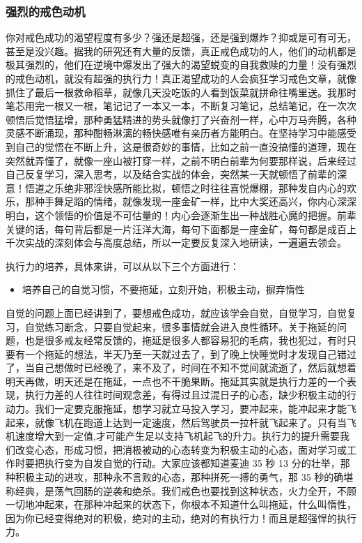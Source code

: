 \subsubsection{强烈的戒色动机}

你对戒色成功的渴望程度有多少？强还是超强，还是强到爆炸？抑或是可有可无，甚至是没兴趣。据我的研究还有大量的反馈，真正戒色成功的人，他们的动机都是极其强烈的，他们在逆境中爆发出了强大的渴望蜕变的自我救赎的力量！没有强烈的戒色动机，就没有超强的执行力！真正渴望成功的人会疯狂学习戒色文章，就像抓住了最后一根救命稻草，就像几天没吃饭的人看到饭菜就拼命往嘴里送。我那时笔芯用完一根又一根，笔记记了一本又一本，不断复习笔记，总结笔记，在一次次顿悟后觉悟猛增，那种勇猛精进的势头就像打了兴奋剂一样，心中万马奔腾，各种灵感不断涌现，那种酣畅淋漓的畅快感唯有亲历者方能明白。在坚持学习中能感受到自己的觉悟在不断上升，这是很奇妙的事情，比如之前一直没搞懂的道理，现在突然就弄懂了，就像一座山被打穿一样，之前不明白前辈为何要那样说，后来经过自己反复学习，深入思考，以及结合实战的体会，突然某一天就顿悟了前辈的深意！悟道之乐绝非邪淫快感所能比拟，顿悟之时往往喜悦爆棚，那种发自内心的欢乐，那种手舞足蹈的情绪，就像发现一座金矿一样，比中大奖还高兴，你内心深深明白，这个领悟的价值是不可估量的！内心会逐渐生出一种战胜心魔的把握。前辈关键的话，每句背后都是一片汪洋大海，每句下面都是一座金矿，每句都是成百上千次实战的深刻体会与高度总结，所以一定要反复深入地研读，一遍遍去领会。

执行力的培养，具体来讲，可以从以下三个方面进行：

\begin{itemize}
    \item 培养自己的自觉习惯，不要拖延，立刻开始，积极主动，摒弃惰性
\end{itemize}

自觉的问题上面已经讲到了，要想戒色成功，就应该学会自觉，自觉学习，自觉复习，自觉练习断念，只要自觉起来，很多事情就会进入良性循环。关于拖延的问题，也是很多戒友经常反馈的，拖延是很多人都容易犯的毛病，我也犯过，有时只要有一个拖延的想法，半天乃至一天就过去了，到了晚上快睡觉时才发现自己错过了，当自己想做时已经晚了，来不及了，时间在不知不觉间就流逝了，然后就想着明天再做，明天还是在拖延，一点也不干脆果断。拖延其实就是执行力差的一个表现，执行力差的人往往时间观念差，有得过且过混日子的心态，缺少积极主动的行动力。我们一定要克服拖延，想学习就立马投入学习，要冲起来，能冲起来才能飞起来，就像飞机在跑道上达到一定速度，然后驾驶员一拉杆就飞起来了。只有当飞机速度增大到一定值,才可能产生足以支持飞机起飞的升力。执行力的提升需要我们改变心态，形成习惯，把消极被动的心态转变为积极主动的心态，面对学习或工作时要把执行变为自发自觉的行动。大家应该都知道麦迪 35 秒 13 分的壮举，那种积极主动的进攻，那种永不言败的心态，那种拼死一搏的勇气，那 35 秒的确堪称经典，是荡气回肠的逆袭和绝杀。我们戒色也要找到这种状态，火力全开，不顾一切地冲起来，在那种冲起来的状态下，你根本不知道什么叫拖延，什么叫惰性，因为你已经变得绝对的积极，绝对的主动，绝对的有执行力！而且是超强悍的执行力。

